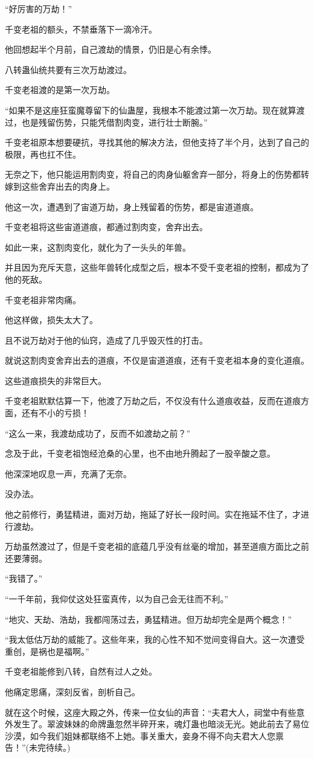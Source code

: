 \begin{this_body}
“好厉害的万劫！”

千变老祖的额头，不禁垂落下一滴冷汗。

他回想起半个月前，自己渡劫的情景，仍旧是心有余悸。

八转蛊仙统共要有三次万劫渡过。

千变老祖渡的是第一次万劫。

“如果不是这座狂蛮魔尊留下的仙蛊屋，我根本不能渡过第一次万劫。现在就算渡过，也是残留伤势，只能凭借割肉变，进行壮士断腕。”

千变老祖原本想要硬抗，寻找其他的解决方法，但他支持了半个月，达到了自己的极限，再也扛不住。

无奈之下，他只能运用割肉变，将自己的肉身仙躯舍弃一部分，将身上的伤势都转嫁到这些舍弃出去的肉身上。

他这一次，遭遇到了宙道万劫，身上残留着的伤势，都是宙道道痕。

千变老祖将这些宙道道痕，都通过割肉变，舍弃出去。

如此一来，这割肉变化，就化为了一头头的年兽。

并且因为充斥天意，这些年兽转化成型之后，根本不受千变老祖的控制，都成为了他的死敌。

千变老祖非常肉痛。

他这样做，损失太大了。

且不说万劫对于他的仙窍，造成了几乎毁灭性的打击。

就说这割肉变舍弃出去的道痕，不仅是宙道道痕，还有千变老祖本身的变化道痕。

这些道痕损失的非常巨大。

千变老祖默默估算一下，他渡了万劫之后，不仅没有什么道痕收益，反而在道痕方面，还有不小的亏损！

“这么一来，我渡劫成功了，反而不如渡劫之前？”

念及于此，千变老祖饱经沧桑的心里，也不由地升腾起了一股辛酸之意。

他深深地叹息一声，充满了无奈。

没办法。

他之前修行，勇猛精进，面对万劫，拖延了好长一段时间。实在拖延不住了，才进行渡劫。

万劫虽然渡过了，但是千变老祖的底蕴几乎没有丝毫的增加，甚至道痕方面比之前还要薄弱。

“我错了。”

“一千年前，我仰仗这处狂蛮真传，以为自己会无往而不利。”

“地灾、天劫、浩劫，我都闯荡过去，勇猛精进。但万劫却完全是两个概念！”

“我太低估万劫的威能了。这些年来，我的心性不知不觉间变得自大。这一次遭受重创，是祸也是福啊。”

千变老祖能修到八转，自然有过人之处。

他痛定思痛，深刻反省，剖析自己。

就在这个时候，这座大殿之外，传来一位女仙的声音：“夫君大人，祠堂中有些意外发生了。翠波妹妹的命牌蛊忽然半碎开来，魂灯蛊也暗淡无光。她此前去了易位沙漠，如今我们姐妹都联络不上她。事关重大，妾身不得不向夫君大人您禀告！”(未完待续。)

\end{this_body}

